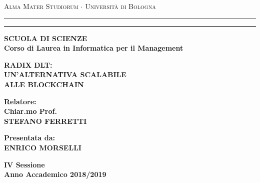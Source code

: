 \documentclass[12pt,a4paper]{report}
\begin{document}
\begin{titlepage}
\begin{center}
{{\Large{\textsc{Alma Mater Studiorum $\cdot$ Universit\`a di
Bologna}}}} \rule[0.1cm]{15.8cm}{0.1mm}
\rule[0.5cm]{15.8cm}{0.6mm}
{\small{\bf SCUOLA DI SCIENZE\\
Corso di Laurea in Informatica per il Management }}
\end{center}
\vspace{15mm}
\begin{center}
{\LARGE{\bf RADIX DLT:}}\\
\vspace{3mm}
{\LARGE{\bf UN'ALTERNATIVA SCALABILE}}\\
\vspace{3mm}
{\LARGE{\bf ALLE BLOCKCHAIN}}\\
\end{center}
\vspace{40mm}
\par
\noindent
\begin{minipage}[t]{0.47\textwidth}
{\large{\bf Relatore:\\
Chiar.mo Prof.\\
STEFANO FERRETTI}}
\end{minipage}
\hfill
\begin{minipage}[t]{0.47\textwidth}\raggedleft
{\large{\bf Presentata da:\\
ENRICO MORSELLI}}
\end{minipage}
\vspace{20mm}
\begin{center}
{\large{\bf IV Sessione\\%
Anno Accademico 2018/2019}}%
\end{center}
\end{titlepage}
\end{document}
